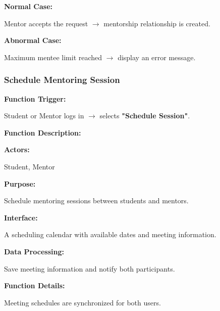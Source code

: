 \textbf{Normal Case:}

Mentor accepts the request $\rightarrow$ mentorship relationship is created.

\textbf{Abnormal Case:}

Maximum mentee limit reached $\rightarrow$ display an error message.

%

\subsubsection{Schedule Mentoring Session}

\textbf{Function Trigger:}

Student or Mentor logs in $\rightarrow$ selects \textbf{"Schedule Session"}.

\vspace{0.3cm}

\textbf{Function Description:}

\textbf{Actors:}

Student, Mentor

\vspace{0.2cm}

\textbf{Purpose:}

Schedule mentoring sessions between students and mentors.

\vspace{0.2cm}

\textbf{Interface:}

A scheduling calendar with available dates and meeting information.

\vspace{0.2cm}

\textbf{Data Processing:}

Save meeting information and notify both participants.

\vspace{0.3cm}

\textbf{Function Details:}

Meeting schedules are synchronized for both users.

